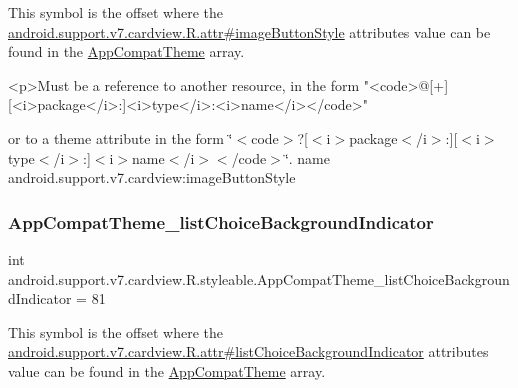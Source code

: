 This symbol is the offset where the \hyperlink{classandroid_1_1support_1_1v7_1_1cardview_1_1R_1_1attr_a36e9cbb5329e25be31dcb0c96046568d}{android.\+support.\+v7.\+cardview.\+R.\+attr\#image\+Button\+Style} attribute\textquotesingle{}s value can be found in the \hyperlink{classandroid_1_1support_1_1v7_1_1cardview_1_1R_1_1styleable_a52e6f69f954ecc2622d72c0b4d298938}{App\+Compat\+Theme} array.

\begin{DoxyVerb}      <p>Must be a reference to another resource, in the form "<code>@[+][<i>package</i>:]<i>type</i>:<i>name</i></code>"
\end{DoxyVerb}
 or to a theme attribute in the form \char`\"{}$<$code$>$?\mbox{[}$<$i$>$package$<$/i$>$\+:\mbox{]}\mbox{[}$<$i$>$type$<$/i$>$\+:\mbox{]}$<$i$>$name$<$/i$>$$<$/code$>$\char`\"{}.  name android.\+support.\+v7.\+cardview\+:image\+Button\+Style \mbox{\label{classandroid_1_1support_1_1v7_1_1cardview_1_1R_1_1styleable_ad2bb60a20b18a930a128f24c8459db7b}} 
\subsubsection{\texorpdfstring{App\+Compat\+Theme\+\_\+list\+Choice\+Background\+Indicator}{AppCompatTheme\_listChoiceBackgroundIndicator}}
{\footnotesize\ttfamily int android.\+support.\+v7.\+cardview.\+R.\+styleable.\+App\+Compat\+Theme\+\_\+list\+Choice\+Background\+Indicator = 81\hspace{0.3cm}{\ttfamily [static]}}

This symbol is the offset where the \hyperlink{classandroid_1_1support_1_1v7_1_1cardview_1_1R_1_1attr_a0e0fd170b675856c067c0258df0adf4b}{android.\+support.\+v7.\+cardview.\+R.\+attr\#list\+Choice\+Background\+Indicator} attribute\textquotesingle{}s value can be found in the \hyperlink{classandroid_1_1support_1_1v7_1_1cardview_1_1R_1_1styleable_a52e6f69f954ecc2622d72c0b4d298938}{App\+Compat\+Theme} array.

